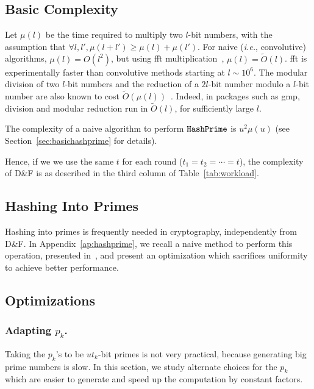 \documentclass[twoside,envcountsame,runningheads]{llncs}
\newcommand{\Oapp}{\ensuremath{\tilde{O}}}
\newcommand{\df}{D\&F\xspace}
\newcommand{\ie}{\textit{i.e.}\xspace}
\newcommand{\apref}[1]{Appendix~\ref{#1}}
\newcommand{\apref}[1]{the full version~TODO}
\begin{document}
\subsection{Basic Complexity}
\label{sec:basiccomp}

Let $\mu(l)$ be the time required to multiply two $l$-bit numbers, with the assumption that $\forall l,l', \mu(l+l') \ge \mu(l) + \mu(l')$.
For naive (\ie, convolutive) algorithms, $\mu(l) = O(l^2)$, but using {\sc fft} multiplication~\cite{schonhage1971schnelle}, $\mu(l) = \Oapp(l)$. {\sc fft} is experimentally faster than convolutive methods starting at $l \sim 10^6$.
The modular division of two $l$-bit numbers and the reduction of a $2l$-bit number modulo a $l$-bit number are also known to cost $\Oapp(\mu(l))$~\cite{burnikel1998fast}.
Indeed, in packages such as {\sf gmp}, division and modular reduction run in $\Oapp(l)$, for sufficiently large $l$.

The complexity of a naive algorithm to perform $\tt HashPrime$ is
$u^2 \mu(u)$ (see Section~\ref{sec:basichashprime} for details).

Hence, if we we use the same $t$ for each round ($t_1=t_2=\cdots=t$), the complexity of \df is as described in the third column of Table~\ref{tab:workload}.

\subsection{Hashing Into Primes}
\label{sec:hashprime}

Hashing into primes is frequently needed in cryptography, independently from \df. 
In \apref{ap:hashprime}, we recall a naive method to perform this operation, presented in~\cite{C:HohWat09,PKC:AbdBenPoi13}, and present an optimization which sacrifices uniformity to achieve better performance.

\subsection{Optimizations}

\subsubsection{Adapting $p_k$.}
\label{sec:choicep}

Taking the $p_k$'s to be $ut_k$-bit primes is not very practical, because generating big prime numbers is slow. In this section, we study alternate choices for the $p_k$ which are easier to generate and speed up the computation by constant factors.
\end{document}
